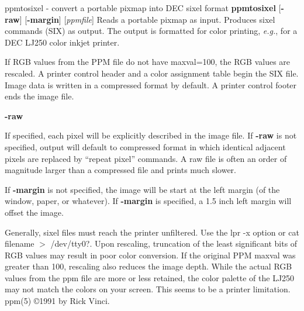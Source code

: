 ppmtosixel - convert a portable pixmap into DEC sixel format
{\bf ppmtosixel}
{\rm [}{\bf -raw}{\rm ]}
{\rm [}{\bf -margin}{\rm ]}
{\rm [}{\it ppmfile}{\rm ]}
Reads a portable pixmap as input.
Produces sixel commands (SIX) as output.
The output is formatted for color printing, {\it e.g.}, for a DEC LJ250 color
inkjet printer. 
\par
If RGB values from the PPM file do not have maxval=100,
the RGB values are rescaled.
A printer control header and a color assignment table begin the SIX file.
Image data is written in a compressed format by default.
A printer control footer ends the image file.
\begin{TPlist}{{\bf -raw}}
\item[{{\bf -raw}}]
If specified, each pixel will be explicitly described in the image file.
If
{\bf -raw}
is not specified, output will default to compressed format in which
identical adjacent pixels are replaced by ``repeat pixel'' commands.
A raw file is often an order of magnitude larger than a compressed
file and prints much slower.
\item[{{\bf -margin}}]
If
{\bf -margin}
is not specified, the image will be start at the left margin
(of the window, paper, or whatever).
If
{\bf -margin}
is specified, a 1.5 inch left margin will offset the image.
\end{TPlist}

Generally, sixel files must reach the printer unfiltered.
Use the lpr -x option or cat filename $>$ /dev/tty0?.
Upon rescaling, truncation of the least significant bits of RGB values
may result in poor color conversion.
If the original PPM maxval was greater than 100, rescaling also
reduces the image depth.
While the actual RGB values from the ppm file are more or less
retained, the color palette of the LJ250 may not match the colors
on your screen.
This seems to be a printer limitation.
ppm(5)
\copyright 1991 by Rick Vinci.
%
 
